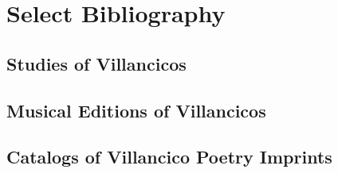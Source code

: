 \section{Select Bibliography}

\subsection{Studies of Villancicos}
\nocite{Rubio:Forma}
\nocite{Laird:VC}
\nocite{Torrente:PhD}
\nocite{Tenorio:SorJuana}
\nocite{CaberoPueyo:PhD}
\nocite{Illari:Polychoral}
\nocite{Knighton-Torrente:VCs}
\nocite{Cashner:Cards}
\printbibliography[heading=none,filter=villancico-studies]

\subsection{Musical Editions of Villancicos}
\nocite{Cererols:MEM-VC}
\nocite{Stevenson:Christmas}
\nocite{Ruimonte:Parnaso}
\nocite{Padilla:Tello}
\nocite{Ezquerro:MME55}
\nocite{RuizSamaniego:MME63}
\nocite{Ezquerro:MME59}
\nocite{Ezquerro:MME65}
\nocite{Fernandez:Cancionero}
\nocite{Torrejon:VCs}
\printbibliography[heading=none,filter=villancico-editions]

\subsection{Catalogs of Villancico Poetry Imprints}
\nocite{BNE:VCs17C}
\nocite{BNE:VCs18C}
\nocite{UK:VCs}
\nocite{US:VCs}
\printbibliography[heading=none,filter=villancico-imprint-catalogs]


